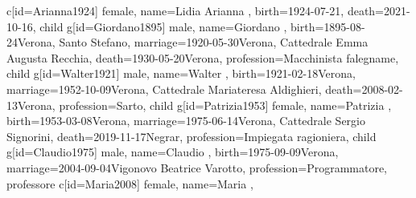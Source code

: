 \documentclass{article}
\begin{document}
\begin{midpage}
\begin{center}
\begin{genealogypicture}
{{{{{{                        c[id=Arianna1924]{
                            female,
                            name={Lidia Arianna },
                            birth={1924-07-21}{},
                            death={2021-10-16}{},
                        }
                    }
                    child{
                        g[id=Giordano1895]{
                            male,
                            name={Giordano },
                            birth={1895-08-24}{Verona, Santo Stefano},
                            marriage={1920-05-30}{Verona, Cattedrale \newline Emma Augusta Recchia},
                            death={1930-05-20}{Verona},
                            profession={Macchinista falegname},
                        }
                        child{
                            g[id=Walter1921]{
                                male,
                                name={Walter },
                                birth={1921-02-18}{Verona},
                                marriage={1952-10-09}{Verona, Cattedrale \newline Mariateresa Aldighieri},
                                death={2008-02-13}{Verona},
                                profession={Sarto},
                            }
                            child{
                                g[id=Patrizia1953]{
                                    female,
                                    name={Patrizia },
                                    birth={1953-03-08}{Verona},
                                    marriage={1975-06-14}{Verona, Cattedrale \newline Sergio Signorini},
                                    death={2019-11-17}{Negrar},
                                    profession={Impiegata ragioniera},
                                }
                                child{
                                    g[id=Claudio1975]{
                                        male,
                                        name={Claudio },
                                        birth={1975-09-09}{Verona},
                                        marriage={2004-09-04}{Vigonovo \newline Beatrice Varotto},
                                        profession={Programmatore, professore}
                                    }
                                    c[id=Maria2008]{
                                        female,
                                        name={Maria },
}}}}}}}}}}
\end{genealogypicture}
\end{center}
\end{midpage}
\end{document}
